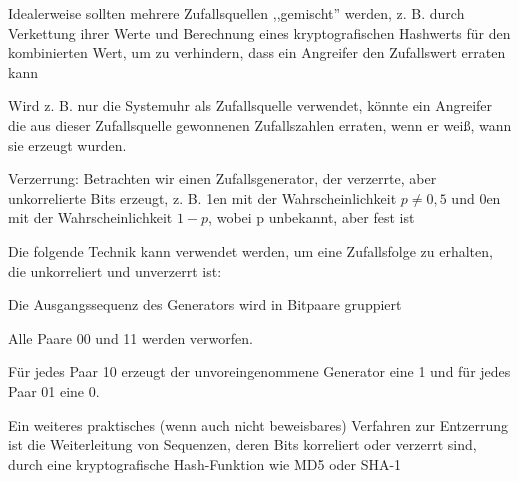 \documentclass[a4paper]{article}
\begin{document}
\begin{multicols}{3}
\begin{itemize*}
            \item Idealerweise sollten mehrere Zufallsquellen ,,gemischt'' werden, z. B. durch Verkettung ihrer Werte und Berechnung eines kryptografischen Hashwerts für den kombinierten Wert, um zu verhindern, dass ein Angreifer den Zufallswert erraten kann
            \item Wird z. B. nur die Systemuhr als Zufallsquelle verwendet, könnte ein Angreifer die aus dieser Zufallsquelle gewonnenen Zufallszahlen erraten, wenn er weiß, wann sie erzeugt wurden.
            \item Verzerrung:  Betrachten wir einen Zufallsgenerator, der verzerrte, aber unkorrelierte Bits erzeugt, z. B. 1en mit der Wahrscheinlichkeit $p\not= 0,5$ und 0en mit der Wahrscheinlichkeit $1-p$, wobei p unbekannt, aber fest ist
            \item Die folgende Technik kann verwendet werden, um eine Zufallsfolge zu erhalten, die unkorreliert und unverzerrt ist:
            \begin{itemize*}
                  \item Die Ausgangssequenz des Generators wird in Bitpaare gruppiert
                  \item Alle Paare 00 und 11 werden verworfen.
                  \item Für jedes Paar 10 erzeugt der unvoreingenommene Generator eine 1 und für jedes Paar 01 eine 0.
            \end{itemize*}
            \item Ein weiteres praktisches (wenn auch nicht beweisbares) Verfahren zur Entzerrung ist die Weiterleitung von Sequenzen, deren Bits korreliert oder verzerrt sind, durch eine kryptografische Hash-Funktion wie MD5 oder SHA-1
      \end{itemize*}


\end{multicols}
\end{document}
